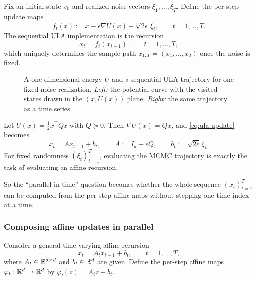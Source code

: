 \documentclass[11pt]{article}
\begin{document}
\begin{definition}
\label{def:ula-rollout-fixed-noise}
Fix an initial state $x_0$ and realized noise vectors $\xi_1,\dots,\xi_T$.
Define the per-step update maps
\[
f_t(x) := x - \epsilon \nabla U(x) + \sqrt{2\epsilon}\,\xi_t,
\qquad t=1,\dots,T.
\]
The sequential ULA implementation is the recursion
\begin{equation}
  x_t = f_t(x_{t-1}), \qquad t=1,\dots,T,
  \label{eq:rollout-recursion}
\end{equation}
which uniquely determines the sample path $x_{1:T}=(x_1,\dots,x_T)$ once the noise is fixed.
\end{definition}

\begin{figure}[t]
  \centering
  
  \caption{A one-dimensional energy $U$ and a sequential ULA trajectory for one fixed noise realization.
  \emph{Left:} the potential curve with the visited states drawn in the $(x,U(x))$ plane.
  \emph{Right:} the same trajectory as a time series.}
  \label{fig:parallel-mcmc-ula-energy-path}
\end{figure}

\begin{example}
\label{ex:quadratic-ula-affine}
Let $U(x)=\tfrac12 x^\top Qx$ with $Q\succeq 0$.
Then $\nabla U(x)=Qx$, and \eqref{eq:ula-update} becomes
\begin{equation}
  x_t = A x_{t-1} + b_t,
  \qquad
  A:=I_d-\epsilon Q,
  \qquad
  b_t:=\sqrt{2\epsilon}\,\xi_t.
  \label{eq:affine-recursion-ula}
\end{equation}
For fixed randomness $(\xi_t)_{t=1}^T$, evaluating the MCMC trajectory is exactly the task of evaluating an affine recursion.%
\end{example}

So the ``parallel-in-time'' question becomes whether the whole sequence $(x_t)_{t=1}^T$ can be computed from the per-step affine maps without stepping one time index at a time.

\subsubsection{Composing affine updates in parallel}
\label{subsubsec:affine-scan}

Consider a general time-varying affine recursion
\begin{equation}
  x_t = A_t x_{t-1} + b_t,
  \qquad t=1,\dots,T,
  \label{eq:affine-recursion}
\end{equation}
where $A_t\in\mathbb{R}^{d\times d}$ and $b_t\in\mathbb{R}^d$ are given.
Define the per-step affine maps $\varphi_t:\mathbb{R}^d\to\mathbb{R}^d$ by $\varphi_t(z)=A_t z+b_t$.
\end{document}
